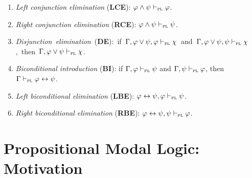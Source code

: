 \documentclass[a4paper, 11pt]{article} %
\begin{document}
\begin{enumerate}[itemsep=2pt]
	\item \textit{Left conjunction elimination} (\textbf{LCE}): $\varphi \wedge \psi \vdash_{\textsc{pl}} \varphi$.
	\item \textit{Right conjunction elimination} (\textbf{RCE}): $\varphi \wedge \psi \vdash_{\textsc{pl}} \psi$.
	\item \mbox{\textit{Disjunction elimination} (\textbf{DE}): if $\Gamma, \varphi \vee \psi, \varphi \vdash_{\textsc{pl}} \chi$ and $\Gamma, \varphi \vee \psi, \psi \vdash_{\textsc{pl}} \chi$, then $\Gamma, \varphi \vee \psi \vdash_{\textsc{pl}} \chi$.}
	\item \textit{Biconditional introduction} (\textbf{BI}): if $\Gamma, \varphi \vdash_{\textsc{pl}} \psi$ and $\Gamma, \psi \vdash_{\textsc{pl}} \varphi$, then $\Gamma \vdash_{\textsc{pl}} \varphi \leftrightarrow \psi$.
	\item \textit{Left biconditional elimination} (\textbf{LBE}): $\varphi \leftrightarrow \psi, \varphi \vdash_{\textsc{pl}} \psi$.
	\item \textit{Right biconditional elimination} (\textbf{RBE}): $\varphi \leftrightarrow \psi, \psi \vdash_{\textsc{pl}} \varphi$.
\end{enumerate}





\section*{\sc Propositional Modal Logic: Motivation}
\end{document}

